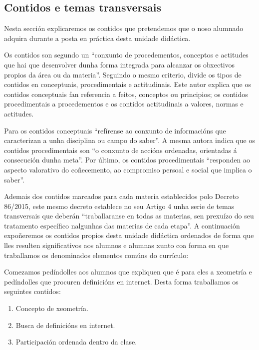 \subsection{Contidos e temas transversais}\label{sec:contidos}

Nesta sección explicaremos os contidos que pretendemos que o noso alumnado adquira durante a posta en práctica desta unidade didáctica.

Os contidos son segundo \cite{orientacionesgobvasco} un ``conxunto de procedementos, conceptos e actitudes que hai que desenvolver dunha forma integrada para alcanzar os obxectivos propios da área ou da materia''. Seguindo o mesmo criterio,  divide os tipos de contidos en conceptuais, procedimentais e actitudinais. Este autor explica que os contidos conceptuais fan referencia a feitos, conceptos ou principios; os contidos procedimentais a procedementos e os contidos actitudinais a valores, normas e actitudes.

Para  os contidos conceptuais ``refírense ao conxunto de informacións que caracterizan a unha disciplina ou campo do saber''. A mesma autora indica que os contidos procedimentais son ``o conxunto de accións ordenadas, orientadas á consecución dunha meta''. Por último, os contidos procedimentais ``responden ao aspecto valorativo do coñecemento, ao compromiso persoal e social que implica o saber''.

Ademais dos contidos marcados para cada materia establecidos polo Decreto 86/2015, este mesmo decreto establece no seu Artigo 4 unha serie de temas transversais que deberán ``traballaranse en todas as materias, sen prexuízo do seu tratamento específico nalgunhas das materias de cada etapa''. A continuación expoñeremos os contidos propios desta unidade didáctica ordenados de forma que lles resulten significativos aos alumnos e alumnas xunto coa forma en que traballamos os denominados elementos comúns do currículo:

Comezamos pedíndolles aos alumnos que expliquen que é para eles a xeometría e pedíndolles que procuren definicións en internet. Desta forma traballamos os seguintes contidos:

\begin{enumerate}[label=\bfseries Con\arabic*, align=left, leftmargin=1.5cm]
    \item\label{con:xeometria} Concepto de xeometría.
    \item\label{con:buscadefinicions} Busca de definicións en internet.
    \item\label{con:participacionclase} Participación ordenada dentro da clase.
\end{enumerate}

